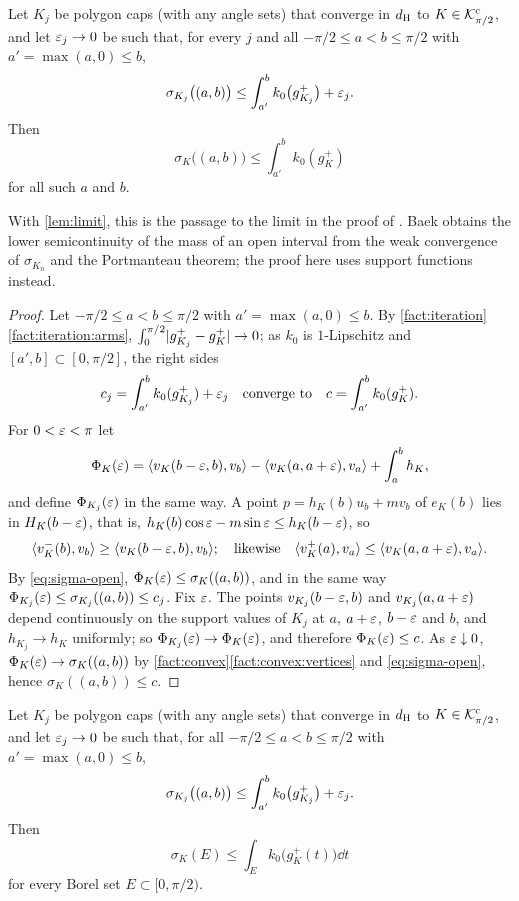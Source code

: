 \begin{lemma}\label{lem:lsc}
Let $K_j$ be polygon caps (with any angle sets) that converge in $d_{\mathrm{H}}$ to
$K\in\mathcal{K}^{\mathrm{c}}_{\pi/2}$, and let $\varepsilon_j\to0$ be such that, for every $j$ and all
$-\pi/2\le a<b\le\pi/2$ with $a'=\max(a,0)\le b$,
\[
  \sigma_{K_j}\bigl((a,b)\bigr)\le\int_{a'}^bk_0\bigl(g_{K_j}^+\bigr)+\varepsilon_j .
\]
Then
\[
  \sigma_K\bigl((a,b)\bigr)\le\int_{a'}^bk_0(g_K^+)
\]
for all such $a$ and $b$.
\end{lemma}

With \cref{lem:limit}, this is the passage to the limit in the proof of
. Baek obtains the lower semicontinuity of the mass of an open
interval from the weak convergence of $\sigma_{K_n}$ and the Portmanteau
theorem; the proof here uses support functions instead.

\begin{proof}
Let $-\pi/2\le a<b\le\pi/2$ with $a'=\max(a,0)\le b$. By
\cref{fact:iteration}\ref{fact:iteration:arms},
$\int_0^{\pi/2}\lvert g_{K_j}^+-g_K^+\rvert\to0$; as $k_0$ is $1$-Lipschitz and
$[a',b]\subset[0,\pi/2]$, the right sides
\[
  c_j=\int_{a'}^bk_0(g_{K_j}^+)+\varepsilon_j\quad\text{converge to}\quad
  c=\int_{a'}^bk_0(g_K^+).
\]
For $0<\varepsilon<\pi$ let
\[
  \Phi_K(\varepsilon)=\langle v_K(b-\varepsilon,b),v_b\rangle-\langle v_K(a,a+\varepsilon),v_a\rangle+\int_a^bh_K,
\]
and define $\Phi_{K_j}(\varepsilon)$ in the same way. A point $p=h_K(b)u_b+mv_b$ of
$e_K(b)$ lies in $H_K(b-\varepsilon)$, that is, $h_K(b)\cos\varepsilon-m\sin\varepsilon\le
h_K(b-\varepsilon)$, so
\[
  \langle v_K^-(b),v_b\rangle\ge\langle v_K(b-\varepsilon,b),v_b\rangle;\quad\text{likewise}\quad
  \langle v_K^+(a),v_a\rangle\le\langle v_K(a,a+\varepsilon),v_a\rangle.
\]
By \eqref{eq:sigma-open},
$\Phi_K(\varepsilon)\le\sigma_K((a,b))$, and in the same way
$\Phi_{K_j}(\varepsilon)\le\sigma_{K_j}((a,b))\le c_j$. Fix $\varepsilon$. The points
$v_{K_j}(b-\varepsilon,b)$ and $v_{K_j}(a,a+\varepsilon)$ depend continuously on the support
values of $K_j$ at $a$, $a+\varepsilon$, $b-\varepsilon$ and $b$, and $h_{K_j}\to h_K$
uniformly; so $\Phi_{K_j}(\varepsilon)\to\Phi_K(\varepsilon)$, and therefore $\Phi_K(\varepsilon)\le
c$. As $\varepsilon\downarrow0$, $\Phi_K(\varepsilon)\to\sigma_K((a,b))$ by
\cref{fact:convex}\ref{fact:convex:vertices} and \eqref{eq:sigma-open}, hence
$\sigma_K((a,b))\le c$.
\end{proof}

\begin{lemma}\label{lem:limit}
Let $K_j$ be polygon caps (with any angle sets) that converge in $d_{\mathrm{H}}$ to
$K\in\mathcal{K}^{\mathrm{c}}_{\pi/2}$, and let $\varepsilon_j\to0$ be such that, for all $-\pi/2\le
a<b\le\pi/2$ with $a'=\max(a,0)\le b$,
\[
  \sigma_{K_j}\bigl((a,b)\bigr)\le\int_{a'}^bk_0\bigl(g_{K_j}^+\bigr)+\varepsilon_j .
\]
Then
\[
  \sigma_K(E)\le\int_Ek_0\bigl(g_K^+(t)\bigr)\dd t
\]
for every Borel set $E\subset[0,\pi/2)$.
\end{lemma}

